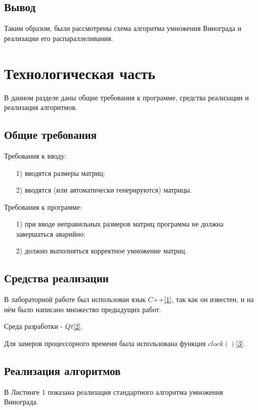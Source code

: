 \documentclass[14pt, a4paper]{extarticle}
\begin{document}
	\subsection*{Вывод}
	Таким образом, были рассмотрены схема алгоритма умножения Винограда и  реализации его распараллеливания.
	
	\clearpage
	\section{Технологическая часть}
	В данном разделе даны общие требования к программе, средства реализации и реализация алгоритмов.
	\subsection{Общие требования}
	Требования к вводу:
	\begin{enumerate}
		\item[1)] вводятся размеры матриц;
		\item[2)] вводятся (или автоматически генерируются) матрицы.
	\end{enumerate}\par
	Требования к программе:
	\begin{enumerate}
		\item[1)] при вводе неправильных размеров матриц программа не должна завершаться аварийно;
		\item[2)] должно выполняться корректное умножение матриц.
	\end{enumerate}
	
	\subsection{Средства реализации}
	В лабораторной работе был использован язык $C$++\hyperref[CPlusPlus]{[1]}, так как он известен, и на нём было написано множество предыдущих работ.
	
	Среда разработки - $Qt$\hyperref[Cute]{[2]}.
	
	Для замеров процессорного времени была использована функция $clock()$\hyperref[CLOCK]{[3]}.
	\newpage
	
	
	
	\subsection{Реализация алгоритмов}
	В Листинге 1 показана реализация стандартного алгоритма умножения Винограда.
	
\end{document}
